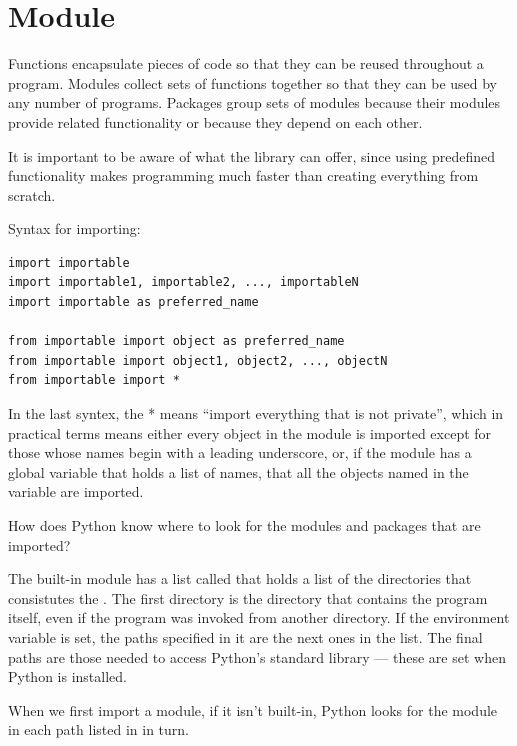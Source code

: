 
\chapter{Module}
\label{cha:module}

Functions encapsulate pieces of code so that they can be reused throughout a program.
Modules collect sets of functions together so that they can be used by any number of programs.
Packages group sets of modules because their modules provide related functionality or because they depend on each other.



It is important to be aware of what the library can offer, since using predefined functionality makes programming much faster than creating everything from scratch.

Syntax for importing:
\begin{lstlisting}
import importable
import importable1, importable2, ..., importableN
import importable as preferred_name

from importable import object as preferred_name
from importable import object1, object2, ..., objectN
from importable import *

\end{lstlisting}



In the last syntex, the * means ``import everything that is not private'',
which in practical terms means
either every object in the module is imported except for those whose names begin with a leading underscore, or,
if the module has a global  variable that holds a list of names, that all the objects named in the  variable are imported.



How does Python know where to look for the modules and packages that are imported?

The built-in  module has a list called  that holds a list of the directories that consistutes the .
The first directory is the directory that contains the program itself, even if the program was invoked from another directory.
If the  environment variable is set, the paths specified in it are the next ones in the list.
The final paths are those needed to access Python’s standard library --- these are set when Python is installed.

When we first import a module, if it isn’t built-in, Python looks for the module in each path listed in  in turn. 


